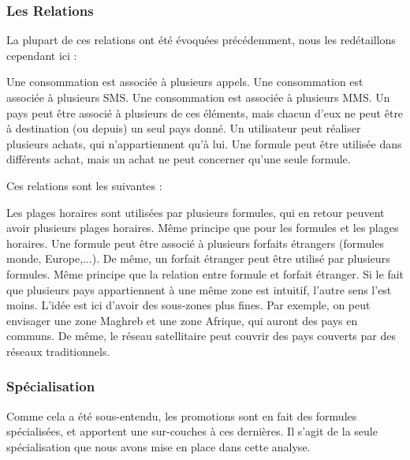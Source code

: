 \subsubsection{Les Relations}
La plupart de ces relations ont été évoquées précédemment, nous les redétaillons cependant ici :
\begin{itemize}
  Une consommation est associée à plusieurs appels.
  Une consommation est associée à plusieurs SMS.
  Une consommation est associée à plusieurs MMS.
  Un pays peut être associé à plusieurs de ces éléments, mais chacun d'eux ne peut être à destination (ou depuis) un seul pays donné.
  Un utilisateur peut réaliser plusieurs achats, qui n'appartiennent qu'à lui.
  Une formule peut être utilisée dans différents achat, mais un achat ne peut concerner qu'une seule formule.
\end{itemize}

Ces relations sont les suivantes :
\begin {itemize}
  Les plages horaires sont utilisées par plusieurs formules, qui en retour peuvent avoir plusieurs plages horaires.
  Même principe que pour les formules et les plages horaires.
  Une formule peut être associé à plusieurs forfaits étrangers (formules monde, Europe,...). De même, un forfait étranger peut être utilisé par plusieurs formules.
  Même principe que la relation entre formule et forfait étranger.
  Si le fait que plusieurs pays appartiennent à une même zone est intuitif, l'autre sens l'est moins. L'idée est ici d'avoir des \og sous-zones\fg{} plus fines. Par exemple, on peut envisager une zone Maghreb et une zone Afrique, qui auront des pays en communs. De même, le réseau satellitaire peut couvrir des pays couverts par des réseaux traditionnels.
\end {itemize}

\subsubsection{Spécialisation}
Comme cela a été sous-entendu, les promotions sont en fait des formules spécialisées, et apportent une \og sur-couches\fg{} à ces dernières. Il s'agit de la seule spécialisation que nous avons mise en place dans cette analyse.

